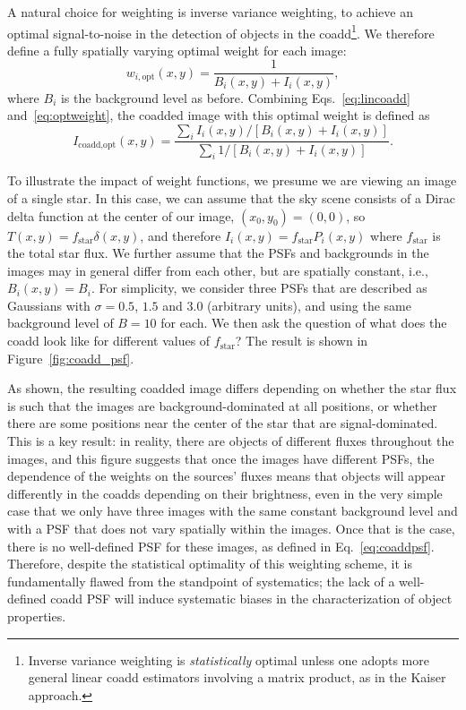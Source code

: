 \documentclass{aastex63}
\newcommand{\irresponse}[1]{{#1}}
\begin{document}
A natural choice for weighting is inverse variance weighting, to achieve an optimal signal-to-noise in the detection of objects in the coadd\footnote{Inverse variance weighting is {\em statistically} optimal unless one adopts more general linear coadd estimators involving a matrix product, as in the Kaiser approach.}.  We therefore define a fully spatially varying optimal weight for each image:
\begin{equation}\label{eq:optweight}
    w_{i,\text{opt}}(x,y) = \frac{1}{B_i(x,y)+I_i(x,y)},
\end{equation}
\irresponse{where $B_i$ is the background level as before.} 
Combining Eqs.~\eqref{eq:lincoadd} and~\eqref{eq:optweight}, the coadded image with this optimal weight is defined as
\begin{equation}\label{eq:optcoadd}
    I_\text{coadd,opt}(x,y) = \frac{\sum_i I_i(x,y)/\left[B_i(x,y)+I_i(x,y)\right]}{\sum_i 1/\left[B_i(x,y)+I_i(x,y)\right]}.
\end{equation}

To illustrate the impact of weight functions, we presume we are viewing an image of a single star.  In this case, we can assume that the sky scene consists of a \irresponse{Dirac} delta function at the center of our image, $(x_0,y_0) = (0,0)$, so  $T(x,y)=f_\text{star}\delta(x,y)$, and therefore $I_i(x,y)=f_\text{star}P_i(x,y)$ where $f_\text{star}$ is the total star flux.  We further assume that the PSFs and backgrounds in the images \irresponse{may} in general differ from each other, but are spatially constant, i.e., $B_i(x,y)=B_i$.  For simplicity, we consider three PSFs that are described as Gaussians with $\sigma=0.5$, $1.5$ and $3.0$ (arbitrary units), and using the same background level of $B=10$ for each.  We then ask the question of what does the coadd look like for different values of $f_\text{star}$?  The result is shown in Figure~\ref{fig:coadd_psf}.

As shown, the resulting coadded image differs depending on whether the star flux is such that the images are background-dominated at all positions, or whether there are some positions near the center of the star that are signal-dominated.  This is a key result: in reality, there are objects of different fluxes throughout the images, and this figure suggests that once the images have different PSFs, the dependence of the weights on the \irresponse{sources' fluxes} means that objects will appear differently in the coadds depending on their brightness, even in the very simple case that we only have \irresponse{three} images with the same constant background level and with a PSF that does not vary spatially within the images.  Once that is the case, there is no well-defined PSF for these images, as defined in Eq.~\eqref{eq:coaddpsf}.  Therefore, despite the statistical optimality of this weighting scheme, it is fundamentally flawed from the standpoint of systematics; the lack of a well-defined coadd PSF will induce systematic biases in the characterization of object properties.
\end{document}
